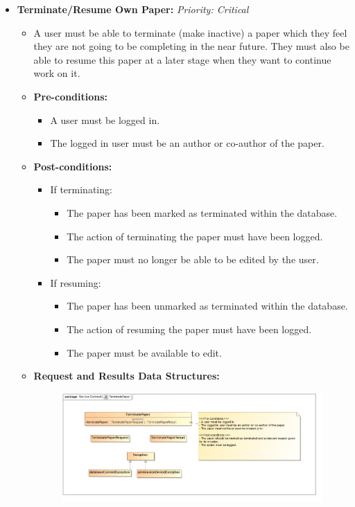 \documentclass{article}
\begin{document}
\begin{itemize}
					\cleardoublepage
					\item \textbf{Terminate/Resume Own Paper:} \hfill \textit{Priority: Critical}
					\begin{itemize}
						\item A user must be able to terminate (make inactive) a paper which they feel they are not going to be completing in the near future. They must also be able to resume this paper at a later stage when they want to continue work on it.
						\item \textbf{Pre-conditions:}
						\begin{itemize}
							\item A user must be logged in.
							\item The logged in user must be an author or co-author of the paper.
						\end{itemize}
						\item \textbf{Post-conditions:}
						\begin{itemize}
							\item If terminating:
							\begin{itemize}
								\item The paper has been marked as terminated within the database.
								\item The action of terminating the paper must have been logged.
								\item The paper must no longer be able to be edited by the user.
							\end{itemize}
							\item If resuming:
							\begin{itemize}
								\item The paper has been unmarked as terminated within the database.
								\item The action of resuming the paper must have been logged.
								\item The paper must be available to edit.
							\end{itemize}
						\end{itemize}
						\item \textbf{Request and Results Data Structures:}
						\begin{figure}[H]
							\includegraphics[width=\linewidth]{../Diagrams/ServiceContracts/Publication subsystem/TerminatePaper.jpg}

\end{figure}
\end{itemize}
\end{itemize}
\end{document}

